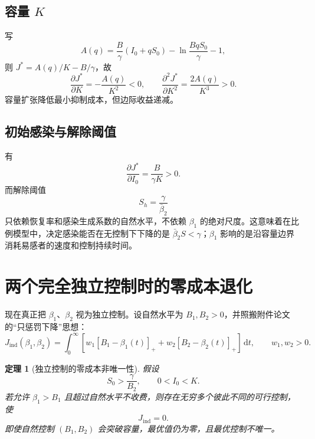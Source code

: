 \documentclass[11pt,a4paper,UTF8]{ctexart}
\newtheorem{theorem}{定理}[section]
\theoremstyle{definition}
\newcommand{\pos}[1]{\left[#1\right]_{+}}
\newcommand{\dd}{\,\mathrm{d}}
\begin{document}
\subsection{容量 \texorpdfstring{$K$}{K}}
写
\begin{equation}
A(q)=\frac{B}{\gamma}(I_0+qS_0)-\ln\frac{BqS_0}{\gamma}-1,
\end{equation}
则 $J^*=A(q)/K-B/\gamma$，故
\begin{equation}
\frac{\partial J^*}{\partial K}=-\frac{A(q)}{K^2}<0,
\qquad
\frac{\partial^2 J^*}{\partial K^2}=\frac{2A(q)}{K^3}>0.
\label{eq:capacity-comparative}
\end{equation}
容量扩张降低最小抑制成本，但边际收益递减。

\subsection{初始感染与解除阈值}
有
\begin{equation}
\frac{\partial J^*}{\partial I_0}=\frac{B}{\gamma K}>0.
\label{eq:I0-comparative}
\end{equation}
而解除阈值
\[
S_h=\frac{\gamma}{\bar\beta_2}
\]
只依赖恢复率和感染生成系数的自然水平，不依赖 $\beta_1$ 的绝对尺度。这意味着在比例模型中，决定感染能否在无控制下下降的是 $\bar\beta_2S<\gamma$；$\beta_1$ 影响的是沿容量边界消耗易感者的速度和控制持续时间。

\section{两个完全独立控制时的零成本退化}
\label{sec:independent-degeneracy}

现在真正把 $\beta_1$、$\beta_2$ 视为独立控制。设自然水平为 $B_1,B_2>0$，并照搬附件论文的“只惩罚下降”思想：
\begin{equation}
J_{\mathrm{ind}}(\beta_1,\beta_2)
=\int_0^\infty
\left[w_1\pos{B_1-\beta_1(t)}+w_2\pos{B_2-\beta_2(t)}\right]\dd t,
\qquad w_1,w_2>0.
\label{eq:independent-cost}
\end{equation}

\begin{theorem}[独立控制的零成本非唯一性]
假设
\begin{equation}
S_0>\frac{\gamma}{B_2},\qquad 0<I_0<K.
\label{eq:degenerate-assumption}
\end{equation}
若允许 $\beta_1>B_1$ 且超过自然水平不收费，则存在无穷多个彼此不同的可行控制，使
\begin{equation}
J_{\mathrm{ind}}=0.
\label{eq:zero-cost}
\end{equation}
即使自然控制 $(B_1,B_2)$ 会突破容量，最优值仍为零，且最优控制不唯一。
\end{theorem}
\end{document}
